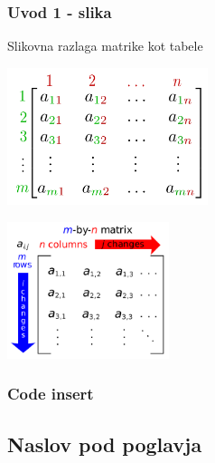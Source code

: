 \documentclass[8pt,aspectratio=169]{beamer} %
\begin{document}
\begin{frame}
	\frametitle{Uvod 1 - slika}
	
	Slikovna razlaga matrike kot tabele
	
	\vspace*{5mm}
	\begin{minipage}{7cm}
		\begin{center}
			\includegraphics[height=4cm]{figs/matrix_01.png}
		\end{center}	
	\end{minipage}
	\hfill
	\begin{minipage}{7cm}
		\begin{center}
			\includegraphics[height=4cm]{figs/matrix_02.png}
		\end{center}	
	\end{minipage}

\end{frame}


\begin{frame}[fragile]
	\frametitle{Code insert}

	

\end{frame}

\subsection{Naslov pod poglavja}

\begin{frame}[plain,noframenumbering,label=newsubsection]
	\vfill
	\begin{center}
		\textbf{\insertsubsectionhead}
	\end{center}
	\vfill
\end{frame}
\end{document}
